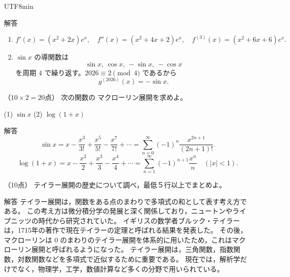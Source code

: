 \documentclass[a4paper,12pt]{article}
\newcommand{\problem}[2]{\par\vspace{0.9em}\noindent{\large 問題 #1}\quad（#2点）\quad\ignorespaces}
\newcommand{\answer}{\par\noindent 解答\quad}
\begin{document}
\begin{CJK}{UTF8}{min}
\answer
\begin{enumerate}[label=(\alph*)]
\item
\[
f'(x)=(x^2+2x)e^x,\quad
f''(x)=(x^2+4x+2)e^x,\quad
f^{(3)}(x)=(x^2+6x+6)e^x.
\]
\item $\sin x$ の導関数は
\[
\sin x,\ \cos x,\ -\sin x,\ -\cos x
\]
を周期 $4$ で繰り返す。$2026\equiv 2\pmod 4$ であるから
\[
g^{(2026)}(x)=-\sin x.
\]
\end{enumerate}

\problem{8}{$10\times 2=20$}
次の関数の マクローリン展開を求めよ。

(1) $\sin x$  (2) $\log(1+x)$

\answer
\[
\sin x
=x-\frac{x^3}{3!}+\frac{x^5}{5!}-\frac{x^7}{7!}+\cdots
=\sum_{n=0}^{\infty}(-1)^n\frac{x^{2n+1}}{(2n+1)!}.
\]
\[
\log(1+x)
=x-\frac{x^2}{2}+\frac{x^3}{3}-\frac{x^4}{4}+\cdots
=\sum_{n=1}^{\infty}(-1)^{n+1}\frac{x^n}{n}
\quad (|x|<1).
\]

\problem{9}{10}
テイラー展開の歴史について調べ，最低５行以上でまとめよ。

\answer
テイラー展開は，関数をある点のまわりで多項式の和として表す考え方である。
この考え方は微分積分学の発展と深く関係しており，ニュートンやライプニッツの時代から研究されていた。
イギリスの数学者ブルック・テイラーは，1715年の著作で現在テイラーの定理と呼ばれる結果を発表した。
その後，マクローリンは $0$ のまわりのテイラー展開を体系的に用いたため，これはマクローリン展開と呼ばれるようになった。
テイラー展開は，三角関数，指数関数，対数関数などを多項式で近似するために重要である。
現在では，解析学だけでなく，物理学，工学，数値計算など多くの分野で用いられている。

\ifPDFTeX
\end{CJK}
\fi
\end{document}
